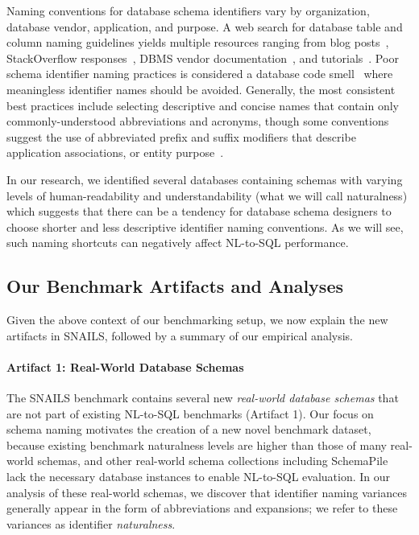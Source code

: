 Naming conventions for database schema identifiers vary by organization, database vendor, application, and purpose.
A web search for database table and column naming guidelines yields multiple resources ranging from blog posts~\cite{csharp-naming-convention}, 
StackOverflow responses~\cite{stackoverflow-naming-convention}, DBMS vendor documentation~\cite{oracle-schema-naming-guidelines}, and tutorials~\cite{inbo-naming-convention}.
Poor schema identifier naming practices is considered a database code smell~\cite{10.1145/3183519.3183529} where meaningless identifier names should be avoided.
Generally, the most consistent best practices include selecting descriptive and concise names that contain only commonly-understood abbreviations and acronyms, though some conventions suggest the use of abbreviated prefix and suffix modifiers that describe application associations, or entity purpose~\cite{oracle-schema-naming-guidelines-2}.

In our research, we identified several databases containing schemas with varying levels of human-readability and understandability (what we will call naturalness) which suggests that there can be a tendency for database schema designers to choose shorter and less descriptive identifier naming conventions.
As we will see, such naming shortcuts can negatively affect NL-to-SQL performance.

\subsection{Our Benchmark Artifacts and Analyses}
Given the above context of our benchmarking setup, we now explain the new artifacts in SNAILS, followed by a summary of our empirical analysis.

\paragraph{Artifact 1: Real-World Database Schemas}
The SNAILS benchmark contains several new \emph{real-world database schemas} that are not part of existing NL-to-SQL benchmarks (Artifact 1).
Our focus on schema naming motivates the creation of a new novel benchmark dataset, because existing benchmark naturalness levels are higher than those of many real-world schemas, and other real-world schema collections including SchemaPile~\cite{doehmen2024schemapile} lack the necessary database instances to enable NL-to-SQL evaluation.
In our analysis of these real-world schemas, we discover that identifier naming variances generally appear in the form of abbreviations and expansions; we refer to these variances as identifier \emph{naturalness}.

